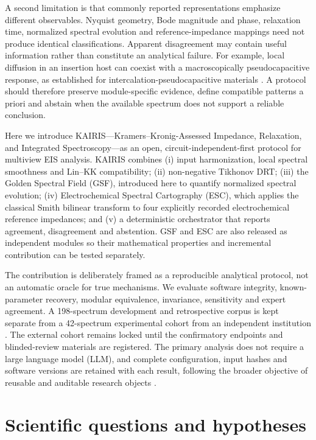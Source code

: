 \documentclass[a4paper,fleqn]{cas-sc}
\begin{document}
A second limitation is that commonly reported representations emphasize
different observables. Nyquist geometry, Bode magnitude and phase, relaxation
time, normalized spectral evolution and reference-impedance mappings need not
produce identical classifications. Apparent disagreement may contain useful
information rather than constitute an analytical failure. For example, local
diffusion in an insertion host can coexist with a macroscopically
pseudocapacitive response, as established for intercalation-pseudocapacitive
materials \cite{Augustyn2013Intercalation}. A protocol should therefore preserve
module-specific evidence, define compatible patterns a priori and abstain when
the available spectrum does not support a reliable conclusion.

Here we introduce KAIRIS---Kramers--Kronig-Assessed Impedance, Relaxation, and
Integrated Spectroscopy---as an open, circuit-independent-first protocol for
multiview EIS analysis. KAIRIS combines (i) input harmonization, local spectral
smoothness and Lin--KK compatibility; (ii) non-negative Tikhonov DRT; (iii) the
Golden Spectral Field (GSF), introduced here to quantify normalized spectral
evolution; (iv) Electrochemical Spectral Cartography (ESC), which applies the
classical Smith bilinear transform to four explicitly recorded electrochemical
reference impedances; and (v) a deterministic
orchestrator that reports agreement, disagreement and abstention. GSF and ESC
are also released as independent modules so their mathematical properties and
incremental contribution can be tested separately.

The contribution is deliberately framed as a reproducible analytical protocol,
not an automatic oracle for true mechanisms. We evaluate software integrity,
known-parameter recovery, modular equivalence, invariance, sensitivity and
expert agreement. A 198-spectrum development and retrospective corpus is kept
separate from a 42-spectrum experimental cohort from an independent institution
\cite{Martinez2026Clustering}. The external cohort remains locked until the
confirmatory endpoints and blinded-review materials are registered. The primary
analysis does not require a large language model (LLM), and complete
configuration, input hashes and software versions are retained with each
result, following the broader objective of reusable and auditable research
objects \cite{Wilkinson2016FAIR}.

\section{Scientific questions and hypotheses}\label{sec:hypotheses}
\end{document}
